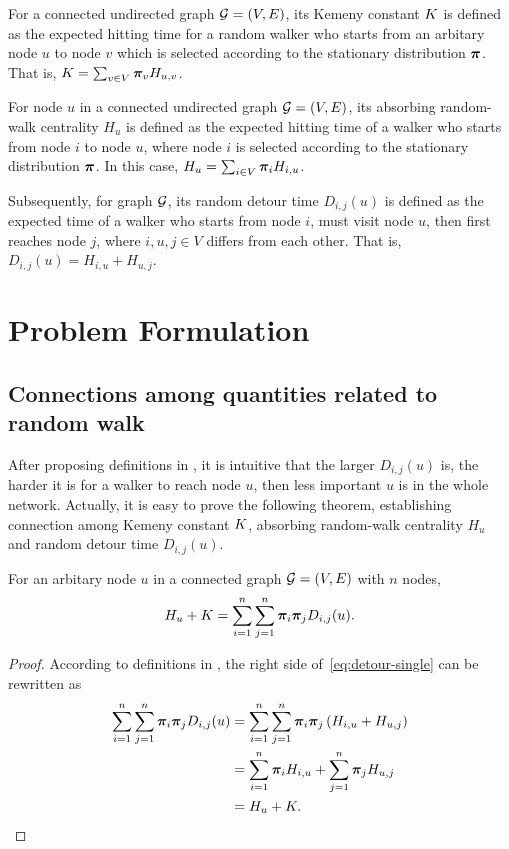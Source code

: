 \documentclass[sigconf]{acmart}
\begin{document}
For a connected undirected graph \(\mathcal{G}=(V,E)\), its Kemeny constant \(K\) is defined as the expected hitting time for a random walker who starts from an arbitary node \(u\) to node \(v\) which is selected according to the stationary distribution \(\boldsymbol{\pi}\).
That is, \(K=\sum_{v\in V}\boldsymbol{\pi}_vH_{u,v}\).

For node \(u\) in a connected undirected graph \(\mathcal{G}=(V,E)\), its absorbing random-walk centrality \(H_u\) is defined as the expected hitting time of a walker who starts from node \(i\) to node \(u\), where node \(i\) is selected according to the stationary distribution \(\boldsymbol{\pi}\).
In this case, \(H_u=\sum_{i\in V}\boldsymbol{\pi}_iH_{i,u}\).

Subsequently, for graph \(\mathcal{G}\), its random detour time \(D_{i,j}(u)\) is defined as the expected time of a walker who starts from node \(i\), must visit node \(u\), then first reaches node \(j\), where \(i,u,j\in V\) differs from each other.
That is, \(D_{i,j}(u)= H_{i,u}+H_{u,j}\).

\section{Problem Formulation}\label{sec:prob-form}

\subsection{Connections among quantities related to random walk}

After proposing definitions in , it is intuitive that the larger \(D_{i,j}(u)\) is, the harder it is for a walker to reach node \(u\), then less important \(u\) is in the whole network.
Actually, it is easy to prove the following theorem, establishing connection among Kemeny constant \(K\), absorbing random-walk centrality \(H_u\) and random detour time \(D_{i,j}(u)\).
\begin{theorem}\label{thm:connection-single}
    For an arbitary node \(u\) in a connected graph \(\mathcal{G}=(V,E)\) with \(n\) nodes,
    \begin{equation}\label{eq:detour-single}
        H_u+K=\sum_{i=1}^n\sum_{j=1}^n\boldsymbol{\pi}_i\boldsymbol{\pi}_jD_{i,j}(u).
    \end{equation}
\end{theorem}
\begin{proof}
    According to definitions in , the right side of~\eqref{eq:detour-single} can be rewritten as
    \begin{align*}
        \sum_{i=1}^n\sum_{j=1}^n\boldsymbol{\pi}_i\boldsymbol{\pi}_jD_{i,j}(u) & =\sum_{i=1}^n\sum_{j=1}^n\boldsymbol{\pi}_i\boldsymbol{\pi}_j\left( H_{i,u}+H_{u,j} \right) \\
                                                           & =\sum_{i=1}^n\boldsymbol{\pi}_iH_{i,u}+\sum_{j=1}^n\boldsymbol{\pi}_jH_{u,j}         \\
                                                           & =H_u+K.
    \end{align*}
\end{proof}
\end{document}
